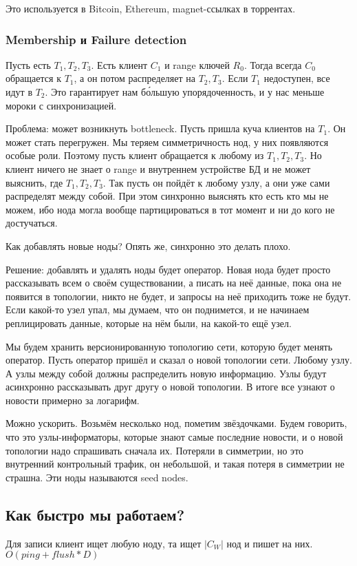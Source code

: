 Это используется в Bitcoin, Ethereum, magnet-ссылках в торрентах.

\subsubsection{Membership и Failure detection}
Пусть есть $T_1, T_2, T_3$. Есть клиент $C_1$ и range ключей $R_0$. Тогда всегда $C_0$ обращается к $T_1$, а он потом распределяет на $T_2, T_3$. Если $T_1$ недоступен, все идут в $T_2$. Это гарантирует нам б\'{о}льшую упорядоченность, и у нас меньше мороки с синхронизацией.

Проблема: может возникнуть bottleneck. Пусть пришла куча клиентов на $T_1$. Он может стать перегружен.  Мы теряем симметричность нод, у них появляются особые роли.
Поэтому пусть клиент обращается к любому из $T_1, T_2, T_3$. Но клиент ничего не знает о range и внутреннем устройстве БД и не может выяснить, где $T_1, T_2, T_3$. Так пусть он пойдёт к любому узлу, а они уже сами распределят между собой. При этом синхронно выяснять кто есть кто мы не можем, ибо нода могла вообще партицироваться в тот момент и ни до кого не достучаться.

Как добавлять новые ноды? Опять же, синхронно это делать плохо. 

Решение: добавлять и удалять ноды будет оператор. Новая нода будет просто рассказывать всем о своём существовании, а писать на неё данные, пока она не появится в топологии, никто не будет, и запросы на неё приходить тоже не будут. Если какой-то узел упал, мы думаем, что он поднимется, и не начинаем реплицировать данные, которые на нём были, на какой-то ещё узел.

Мы будем хранить версионированную топологию сети, которую будет менять оператор. Пусть оператор пришёл и сказал о новой топологии сети. Любому узлу. А узлы между собой должны распределить новую информацию.
Узлы будут асинхронно рассказывать друг другу о новой топологии. В итоге все узнают о новости примерно за логарифм.

Можно ускорить.
Возьмём несколько нод, пометим звёздочками. Будем говорить, что это узлы-информаторы, которые знают самые последние новости, и о новой топологии надо спрашивать сначала их. Потеряли в симметрии, но это внутренний контрольный трафик, он небольшой, и такая потеря в симметрии не страшна.
Эти ноды называются seed nodes. 

\subsection{Как быстро мы работаем?}
Для записи клиент ищет любую ноду, та ищет $|C_W|$ нод и пишет на них.
$O(ping+flush*D)$

